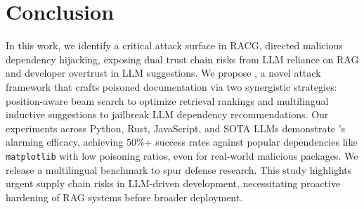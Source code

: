 \section{Conclusion}\label{sec:conclu}

In this work, we identify a critical attack surface in RACG, directed malicious dependency hijacking, exposing dual trust chain risks from LLM reliance on RAG and developer overtrust in LLM suggestions. We propose \method, a novel attack framework that crafts poisoned documentation via two synergistic strategies: position-aware beam search to optimize retrieval rankings and multilingual inductive suggestions to jailbreak LLM dependency recommendations. Our experiments across Python, Rust, JavaScript, and SOTA LLMs demonstrate \method's alarming efficacy, achieving 50\%+ success rates against popular dependencies like \texttt{matplotlib} with low poisoning ratios, even for real-world malicious packages. We release a multilingual benchmark to spur defense research. 
This study highlights urgent supply chain risks in LLM-driven development, necessitating proactive hardening of RAG systems before broader deployment.